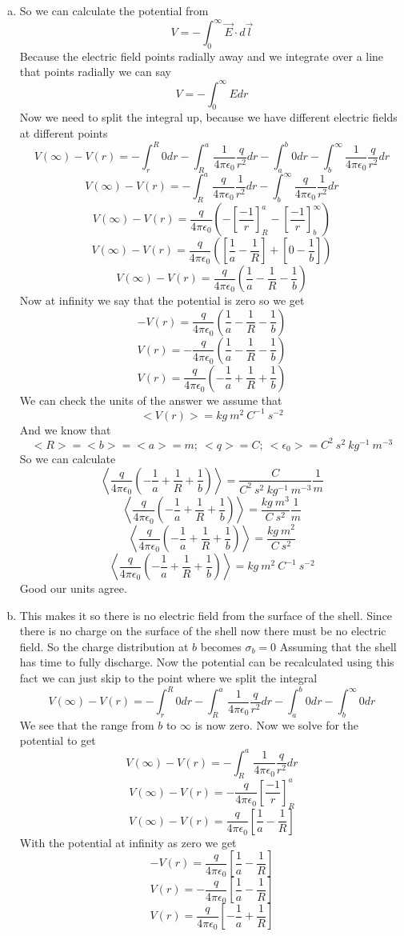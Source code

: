 \documentclass[11pt]{article}
\numberwithin{equation}{section}
\newcommand{\vecE}{\vec{E}}
\begin{document}
\begin{enumerate}[(a)]
\item
So we can calculate the potential from
$$V = -\int_0^{\infty} \vecE \cdot d\vec{l}$$
Because the electric field points radially away and we integrate over a line that points radially we can say
$$V = -\int_0^{\infty} E dr$$
Now we need to split the integral up, because we have different electric fields at different points
$$V(\infty) - V(r) = -\int_r^{R} 0 dr - \int_R^{a} \frac{1}{4\pi \epsilon_0}\frac{q}{r^2}dr - \int_a^b 0 dr - \int_b^{\infty} \frac{1}{4\pi \epsilon_0}\frac{q}{r^2}dr$$
$$V(\infty) - V(r) = - \int_R^{a} \frac{q}{4\pi \epsilon_0}\frac{1}{r^2}dr - \int_b^{\infty} \frac{q}{4\pi \epsilon_0}\frac{1}{r^2}dr$$
$$V(\infty) - V(r) = \frac{q}{4\pi \epsilon_0} \left(- \left[\frac{-1}{r}\right]_R^a - \left[\frac{-1}{r}\right]_b^{\infty}\right)$$
$$V(\infty) - V(r) = \frac{q}{4\pi \epsilon_0} \left(\left[\frac{1}{a}-\frac{1}{R} \right] + \left[0-\frac{1}{b}\right]\right)$$
$$V(\infty) - V(r) = \frac{q}{4\pi \epsilon_0} \left(\frac{1}{a}-\frac{1}{R} -\frac{1}{b}\right)$$
Now at infinity we say that the potential is zero so we get
$$- V(r) = \frac{q}{4\pi \epsilon_0} \left(\frac{1}{a}-\frac{1}{R} -\frac{1}{b}\right)$$
$$V(r) = -\frac{q}{4\pi \epsilon_0} \left(\frac{1}{a}-\frac{1}{R} -\frac{1}{b}\right)$$
$$V(r) = \frac{q}{4\pi \epsilon_0} \left(-\frac{1}{a}+\frac{1}{R} +\frac{1}{b}\right)$$
We can check the units of the answer we assume that $$<V(r)> = kg\ m^2\ C^{-1}\ s^{-2}$$
And we know that 
$$<R>=<b>=<a>=m;\ <q>=C;\ <\epsilon_0> = C^2\ s^2\ kg^{-1}\ m^{-3}$$
So we can calculate 
$$\left<\frac{q}{4\pi \epsilon_0} \left(-\frac{1}{a}+\frac{1}{R} +\frac{1}{b}\right)\right> = \frac{C}{C^2\ s^2\ kg^{-1}\ m^{-3}}\frac{1}{m}$$
$$\left<\frac{q}{4\pi \epsilon_0} \left(-\frac{1}{a}+\frac{1}{R} +\frac{1}{b}\right)\right> = \frac{kg\ m^3}{C\ s^2}\frac{1}{m}$$
$$\left<\frac{q}{4\pi \epsilon_0} \left(-\frac{1}{a}+\frac{1}{R} +\frac{1}{b}\right)\right> = \frac{kg\ m^2}{C\ s^2}$$
$$\left<\frac{q}{4\pi \epsilon_0} \left(-\frac{1}{a}+\frac{1}{R} +\frac{1}{b}\right)\right> = kg\ m^2\ C^{-1}\ s^{-2}$$
Good our units agree.
\item
This makes it so there is no electric field from the surface of the shell. Since there is no charge on the surface of the shell now there must be no electric field. So the charge distribution at $b$ becomes
$\sigma_b = 0$
Assuming that the shell has time to fully discharge. Now the potential can be recalculated using this fact we can just skip to the point where we split the integral 
$$V(\infty) - V(r) = -\int_r^{R} 0 dr - \int_R^{a} \frac{1}{4\pi \epsilon_0}\frac{q}{r^2}dr - \int_a^b 0 dr - \int_b^{\infty} 0dr$$
We see that the range from $b$ to $\infty$ is now zero. Now we solve for the potential to get
$$V(\infty) - V(r) =  -\int_R^{a} \frac{1}{4\pi \epsilon_0}\frac{q}{r^2}dr$$
$$V(\infty) - V(r) =  -\frac{q}{4\pi \epsilon_0}\left[\frac{-1}{r}\right]_R^a $$
$$V(\infty) - V(r) =  \frac{q}{4\pi \epsilon_0}\left[\frac{1}{a}-\frac{1}{R}\right]$$
With the potential at infinity as zero we get
$$ - V(r) =  \frac{q}{4\pi \epsilon_0}\left[\frac{1}{a}-\frac{1}{R}\right]$$
$$  V(r) =  -\frac{q}{4\pi \epsilon_0}\left[\frac{1}{a}-\frac{1}{R}\right]$$
$$  V(r) =  \frac{q}{4\pi \epsilon_0}\left[-\frac{1}{a}+\frac{1}{R}\right]$$
\end{enumerate}
\end{document}
